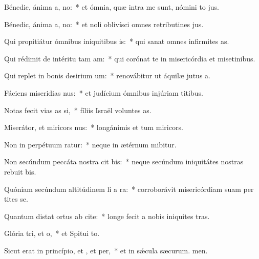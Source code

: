 \item Bénedic, ánima a, no:~* et ómnia, quæ intra me sunt, nómini to jus.
\item Bénedic, ánima a, no:~* et noli oblivísci omnes retributines jus.
\item Qui propitiátur ómnibus iniquitibus is:~* qui sanat omnes infirmites as.
\item Qui rédimit de intéritu tam am:~* qui corónat te in misericórdia et misetinibus.
\item Qui replet in bonis desirium um:~* renovábitur ut áquilæ jutus a.
\item Fáciens miseridias nus:~* et judícium ómnibus injúriam titibus.
\item Notas fecit vias as si,~* fíliis Israël voluntes as.
\item Miserátor, et miricors nus:~* longánimis et tum miricors.
\item Non in perpétuum ratur:~* neque in ætérnum mibitur.
\item Non secúndum peccáta nostra cit bis:~* neque secúndum iniquitátes nostras rebuit bis.
\item Quóniam secúndum altitúdinem li a ra:~* corroborávit misericórdiam suam per tites se.
\item Quantum distat ortus ab cite:~* longe fecit a nobis iniquites tras.
\item Glória tri, et o,~* et Spitui to.
\item Sicut erat in princípio, et , et per,~* et in sǽcula sæcurum. men.
